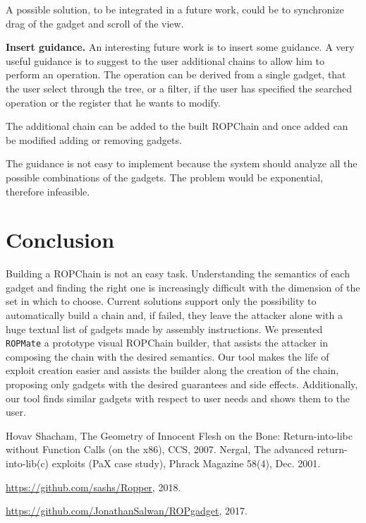 \documentclass[twocolumn, 11pt]{article}
\begin{document}
A possible solution, to be integrated in a future work, could be to synchronize drag of the gadget and scroll of the view.

\textbf{Insert guidance.} An interesting future work is to insert some guidance. A very useful guidance is to suggest to the user additional chains to allow him to perform an operation. The operation can be derived from a single gadget, that the user select through the tree, or a filter, if the user has specified the searched operation or the register that he wants to modify. 

The additional chain can be added to the built ROPChain and once added can be modified adding or removing gadgets.

The guidance is not easy to implement because the system should analyze all the possible combinations of the gadgets. The problem would be exponential, therefore infeasible.


\section{Conclusion}
Building a ROPChain is not an easy task. Understanding the semantics of each gadget and finding the right one is increasingly difficult with the dimension of the set in which to choose. Current solutions support only the possibility to automatically build a chain and, if failed, they leave the attacker alone with a huge textual list of gadgets made by assembly instructions.
We presented \texttt{ROPMate} a prototype visual ROPChain builder, that assists the attacker in composing the chain with the desired semantics. Our tool makes the life of exploit creation easier and assists the builder along the creation of the chain, proposing only gadgets with the desired guarantees and side effects. Additionally, our tool finds similar gadgets with respect to user needs and shows them to the user.



\begin{thebibliography}{99}
    Hovav Shacham,
    The Geometry of Innocent Flesh on the Bone: Return-into-libc without Function Calls (on the x86),
    CCS,
    2007.
    Nergal,
    The advanced return-into-lib(c) exploits (PaX case study),
    Phrack Magazine 58(4),
    Dec. 2001.

     \url{https://github.com/sashs/Ropper},
    2018.

    \url{https://github.com/JonathanSalwan/ROPgadget},
    2017.

\end{thebibliography}
\end{document}
